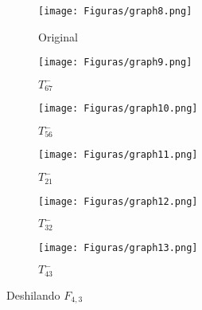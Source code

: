 \begin{figure}[h]
    \begin{subfigure}[b]{0.3\textwidth}
      \begin{minipage}{7cm}
	\centering%
	    \texttt{[image: Figuras/graph8.png]}
	 \end{minipage}
	\caption{Original}
     \end{subfigure}
     \begin{subfigure}[b]{0.3\textwidth}
        \begin{minipage}{7cm}
       	 \centering%
	    \texttt{[image: Figuras/graph9.png]}
        \end{minipage}
        \caption{$T_{6 7}^{-}$}
     \end{subfigure}
     \begin{subfigure}[b]{0.3\textwidth}
        \begin{minipage}{7cm}
       	 \centering%
	    \texttt{[image: Figuras/graph10.png]}
        \end{minipage}
        \caption{$T_{5 6}^{-}$}
     \end{subfigure}
      \begin{subfigure}[b]{0.3\textwidth}
      \begin{minipage}{7cm}
	\centering%
	    \texttt{[image: Figuras/graph11.png]}
	 \end{minipage}
	\caption{$T_{2 1}^{-}$}
     \end{subfigure}
     \begin{subfigure}[b]{0.3\textwidth}
        \begin{minipage}{7cm}
       	 \centering%
	    \texttt{[image: Figuras/graph12.png]}
        \end{minipage}
        \caption{$T_{3 2}^{-}$}
     \end{subfigure}
     \begin{subfigure}[b]{0.3\textwidth}
        \begin{minipage}{7cm}
       	 \centering%
	    \texttt{[image: Figuras/graph13.png]}
        \end{minipage}
        \caption{$T_{4 3}^{-}$}
     \end{subfigure}
     \caption{Deshilando $F_{4, 3}$}
    \label{figura:2.6}
\end{figure}

